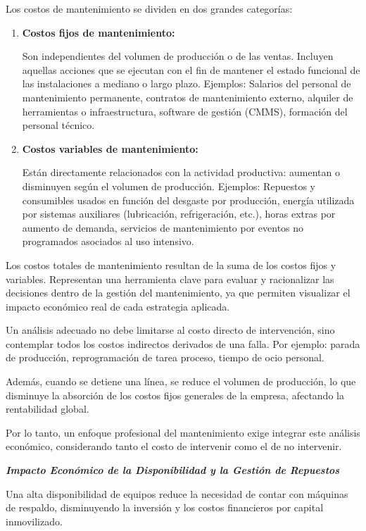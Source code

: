 \documentclass[a4paper,oneside,11pt]{article}
\begin{document}
Los costos de mantenimiento se dividen en dos grandes categorías:

\begin{enumerate}
    \item \textbf{Costos fijos de mantenimiento:}

    Son independientes del volumen de producción o de las ventas.
    Incluyen aquellas acciones que se ejecutan con el fin de mantener el estado funcional de las instalaciones a mediano o largo plazo.
    Ejemplos: Salarios del personal de mantenimiento permanente, contratos de mantenimiento externo, alquiler de herramientas o infraestructura, software de gestión (CMMS), formación del personal técnico.
    \item \textbf{Costos variables de mantenimiento:}

    Están directamente relacionados con la actividad productiva: aumentan o disminuyen según el volumen de producción.
    Ejemplos: Repuestos y consumibles usados en función del desgaste por producción, energía utilizada por sistemas auxiliares (lubricación, refrigeración, etc.), horas extras por aumento de demanda, servicios de mantenimiento por eventos no programados asociados al uso intensivo.
\end{enumerate}

Los costos totales de mantenimiento resultan de la suma de los costos fijos y variables. Representan una herramienta clave para evaluar y racionalizar las decisiones dentro de la gestión del mantenimiento, ya que permiten visualizar el impacto económico real de cada estrategia aplicada.

Un análisis adecuado no debe limitarse al costo directo de intervención, sino contemplar todos los costos indirectos derivados de una falla. Por ejemplo: parada de producción, reprogramación de tarea proceso, tiempo de ocio personal.

Además, cuando se detiene una línea, se reduce el volumen de producción, lo que disminuye la absorción de los costos fijos generales de la empresa, afectando la rentabilidad global.

Por lo tanto, un enfoque profesional del mantenimiento exige integrar este análisis económico, considerando tanto el costo de intervenir como el de no intervenir.

\textbf{\textit{Impacto Económico de la Disponibilidad y la Gestión de Repuestos}}

Una alta disponibilidad de equipos reduce la necesidad de contar con máquinas de respaldo, disminuyendo la inversión y los costos financieros por capital inmovilizado.
\end{document}
